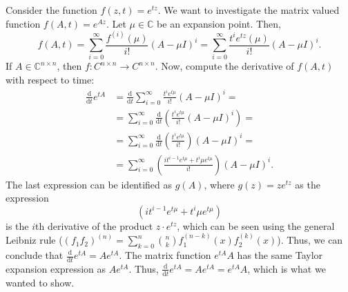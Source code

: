 Consider the function $f(z,t) = e^{tz}$. We want to investigate the matrix valued function $f(A,t) = e^{Az}$. Let $\mu \in \mathbb{C}$ be an expansion point. Then,
\begin{equation}
  f(A,t) = \sum\limits_{i = 0}^{\infty} \frac{f^{(i)}(\mu)}{i!}(A-\mu I)^{i} = \sum\limits_{i = 0}^{\infty} \frac{t^ie^{tz}(\mu)}{i!}(A-\mu I)^{i}.
\end{equation}
If $A\in\mathbb{C}^{n\times n}$, then $f:C^{n \times n}\rightarrow C^{n \times n}$. Now, compute the derivative of $f(A,t)$ with respect to time:
\begin{equation}
\begin{aligned}
\frac{\mathrm d}{\mathrm d t}e^{tA} & = \frac{\mathrm d}{\mathrm dt}\sum^{\infty}_{i = 0} \frac{t^ie^{t\mu}}{i!}(A-\mu I )^i = \\
& = \sum^{\infty}_{i = 0} \frac{\mathrm d}{\mathrm dt}\left(\frac{t^ie^{t\mu}}{i!}(A-\mu I )^i\right) = \\
& = \sum^{\infty}_{i = 0} \frac{\mathrm d}{\mathrm dt}\left(\frac{t^ie^{t\mu}}{i!}\right)(A-\mu I )^i  = \\
&= \sum^{\infty}_{i = 0}  \left(\frac{it^{i-1}e^{t\mu}+t^i\mu e^{t\mu}}{i!}\right) (A-\mu I )^i.
\end{aligned}
\end{equation}
The last expression can be identified as $g(A)$, where $g(z) = ze^{tz}$ as  the expression
\begin{equation}
\left(it^{i-1}e^{t\mu}+t^i\mu e^{t\mu}\right)
\end{equation}
is the $i$th derivative of the product $z\cdot e^{tz}$, which can be seen using the general Leibniz rule ($(f_1f_2)^{(n)} = \sum_{k = 0}^n\binom{n}{k}f_1^{(n-k)}(x)f_2^{(k)}(x)$). Thus, we can conclude that $\frac{\mathrm d }{\mathrm dt}e^{tA} = Ae^{tA}$. The matrix function $e^{tA}A$ has the same Taylor expansion expression as $Ae^{tA}$. Thus, $\frac{\mathrm d }{\mathrm dt}e^{tA} = Ae^{tA} = e^{tA} A$, which is what we wanted to show.






